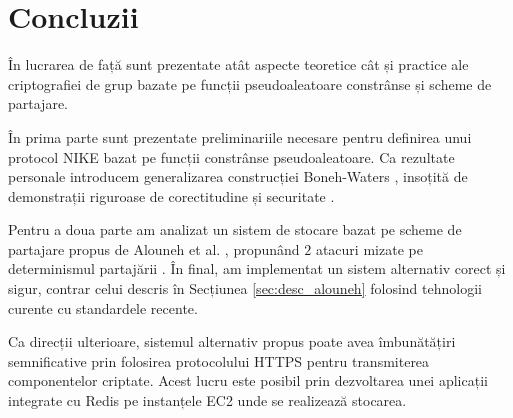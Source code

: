 \documentclass[oneside, 12pt]{book}
\begin{document}
\chapter*{Concluzii}

În lucrarea de față sunt prezentate atât aspecte teoretice cât și practice ale criptografiei de grup bazate pe funcții pseudoaleatoare constrânse și scheme de partajare.

În prima parte sunt prezentate preliminariile necesare pentru definirea unui protocol NIKE bazat pe funcții constrânse pseudoaleatoare. Ca rezultate personale introducem generalizarea construcției Boneh-Waters \cite{boneh:2013constrained}, insoțită de demonstrații riguroase de corectitudine și securitate \cite{RD:2014}.

Pentru a doua parte am analizat un sistem de stocare bazat pe scheme de partajare propus de Alouneh et al. \cite{AAMK:2013}, propunând $2$ atacuri mizate pe determinismul partajării \cite{RD:2015}. În final, am implementat un sistem alternativ corect și sigur, contrar celui descris în Secțiunea \ref{sec:desc_alouneh} folosind tehnologii curente cu standardele recente.

Ca direcții ulterioare, sistemul alternativ propus poate avea îmbunătățiri semnificative prin folosirea protocolului HTTPS pentru transmiterea componentelor criptate. Acest lucru este posibil prin dezvoltarea unei aplicații integrate cu Redis pe instanțele EC2 unde se realizează stocarea.



\clearpage



\end{document}
